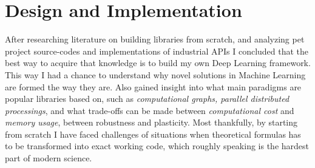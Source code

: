 \chapter{Design and Implementation}

After researching literature on building libraries from scratch, and analyzing pet project source-codes \cite{convnetjs, gibianskysource} and implementations of industrial APIs \cite{TF, caffe, torch}
I concluded that the best way to acquire that knowledge is to build my own Deep Learning framework.
This way I had a chance to understand why novel solutions in Machine Learning are formed the way they are.
Also gained insight into what main paradigms are popular libraries based on, such as \emph{computational graphs, parallel distributed processings}, 
and what trade-offs can be made between \emph{computational cost} and \emph{memory usage}, between robustness and plasticity.
Most thankfully, by starting from scratch I have faced challenges of situations when theoretical formulas has to be transformed into exact working code, which roughly speaking is the hardest part of modern science.


